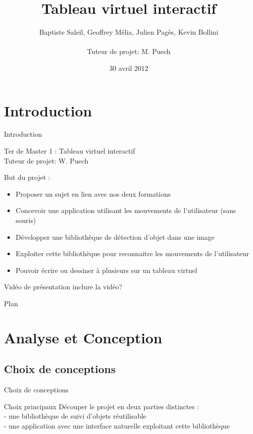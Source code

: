 \documentclass{beamer}
\title{Tableau virtuel interactif}
\author{Baptiste Saleil, Geoffrey Mélia, Julien Pagès, Kevin Bollini \\ \ \\Tuteur de projet: M. Puech}
\date{30 avril 2012}
\begin{document}
	\begin{frame}
		\titlepage
	\end{frame}

	\section{Introduction}
		\begin{frame}{Introduction}
		\begin{center}
		\LARGE{Ter de Master 1 : Tableau virtuel interactif} \\
		\large{Tuteur de projet: W. Puech}
		\end{center}
		
		But du projet :
		\begin{itemize}
      \item Proposer un sujet en lien avec nos deux formations
		\item Concevoir une application utilisant les mouvements de l'utilisateur (sans souris)
		\item Développer une bibliothèque de détection d'objet dans une image
		\item Exploiter cette bibliothèque pour reconnaitre les mouvements de l'utilisateur
		\item Pouvoir écrire ou dessiner à plusieurs sur un tableau virtuel
		\end{itemize}
		
		\end{frame}

	\begin{frame}{Vidéo de présentation}
		inclure la vidéo?
	\end{frame}

	\begin{frame}{Plan}
		\tableofcontents
	\end{frame}
		
	\section{Analyse et Conception}
	\subsection{Choix de conceptions}
		\begin{frame}{Choix de conceptions}
			\begin{block}{Choix principaux}
				Découper le projet en deux parties distinctes : \\
				- une bibliothèque de suivi d'objets réutilisable \\
				- une application avec une interface naturelle exploitant cette bibliothèque \\
			\end{block}
		\end{frame}
		
\end{document}
